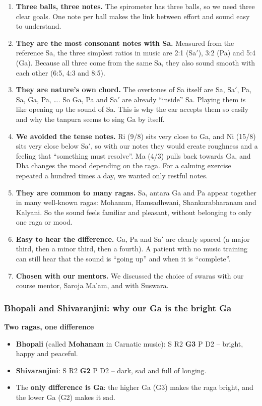 \documentclass[12pt,a4paper]{article}
\newcommand{\Sah}{Sa\ensuremath{'}}     %
\begin{document}
\begin{enumerate}
  \item \textbf{Three balls, three notes.} The spirometer has three balls, so we need three clear goals. One note per ball makes the link between effort and sound easy to understand.
  \item \textbf{They are the most consonant notes with Sa.} Measured from the reference Sa, the three simplest ratios in music are 2:1 (\Sah), 3:2 (Pa) and 5:4 (Ga). Because all three come from the same Sa, they also sound smooth with each other (6:5, 4:3 and 8:5).
  \item \textbf{They are nature's own chord.} The overtones of Sa itself are Sa, \Sah, Pa, Sa, Ga, Pa, \ldots{}. So Ga, Pa and \Sah{} are already ``inside'' Sa. Playing them is like opening up the sound of Sa. This is why the ear accepts them so easily and why the tanpura seems to sing Ga by itself.
  \item \textbf{We avoided the tense notes.} Ri (9/8) sits very close to Ga, and Ni (15/8) sits very close below \Sah, so with our notes they would create roughness and a feeling that ``something must resolve''. Ma (4/3) pulls back towards Ga, and Dha changes the mood depending on the raga. For a calming exercise repeated a hundred times a day, we wanted only restful notes.
  \item \textbf{They are common to many ragas.} Sa, antara Ga and Pa appear together in many well-known ragas: Mohanam, Hamsadhwani, Shankarabharanam and Kalyani. So the sound feels familiar and pleasant, without belonging to only one raga or mood.
  \item \textbf{Easy to hear the difference.} Ga, Pa and \Sah{} are clearly spaced (a major third, then a minor third, then a fourth). A patient with no music training can still hear that the sound is ``going up'' and when it is ``complete''.
  \item \textbf{Chosen with our mentors.} We discussed the choice of swaras with our course mentor, Saroja Ma'am, and with Suswara.
\end{enumerate}

\subsubsection{Bhopali and Shivaranjini: why our Ga is the bright Ga}
\textbf{Two ragas, one difference}
\begin{itemize}
  \item \textbf{Bhopali} (called \textbf{Mohanam} in Carnatic music): S R2 \textbf{G3} P D2 -- bright, happy and peaceful.
  \item \textbf{Shivaranjini}: S R2 \textbf{G2} P D2 -- dark, sad and full of longing.
  \item The \textbf{only difference is Ga}: the higher Ga (G3) makes the raga bright, and the lower Ga (G2) makes it sad.
\end{itemize}
\end{document}

